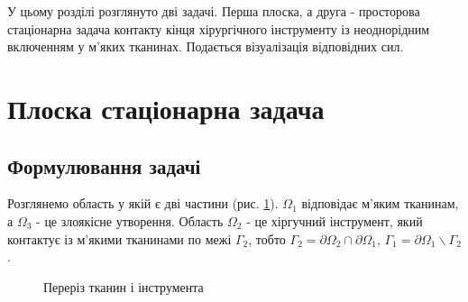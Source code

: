 У цьому розділі розглянуто дві задачі. Перша плоска, а друга - просторова стаціонарна задача контакту кінця хірургічного 
інструменту із неоднорідним включенням у м'яких тканинах. Подається візуалізація відповідних сил.

\section{Плоска стаціонарна задача}

\subsection{Формулювання задачі}

Розглянемо область у якій є дві частини (рис. \ref{fig:elasticity_2d_domain}). $\Omega_1$ відповідає м'яким тканинам, а
$\Omega_3$ - це злоякісне утворення. Область $\Omega_2$ - це хіргучний інструмент, який контактує із м'якими тканинами
по межі $\Gamma_2$, тобто $\Gamma_2=\partial\Omega_2 \cap \partial\Omega_1$, 
$\Gamma_1 = \partial \Omega_1 \backslash \Gamma_2$.

\begin{figure}[ht!]
    \centering
    
    \caption{Переріз тканин і інструмента}
    \label{fig:elasticity_2d_domain}
\end{figure}

